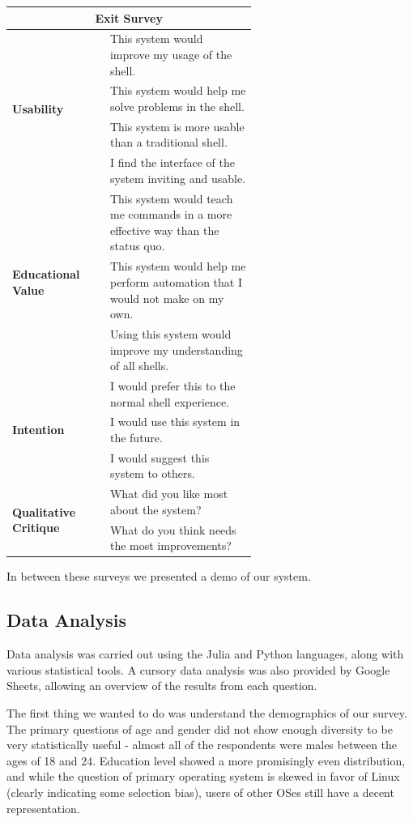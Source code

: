 \begin{center}
  \begin{tabular}{|l|p{0.6\linewidth}|}
    \hline \multicolumn{2}{|c|}{\textbf{\Large Exit Survey}} \\ \hline
    \multirow{4}{*}{\textbf{Usability}}
    & This system would improve my usage of the shell. \\ \cline{2-2}
    & This system would help me solve problems in the shell. \\ \cline{2-2}
    & This system is more usable than a traditional shell. \\ \cline{2-2}
    & I find the interface of the system inviting and usable. \\
    \hline
    \multirow{3}{*}{\textbf{Educational Value}}
    & This system would teach me commands in a more effective way than the
      status quo. \\ \cline{2-2}
    & This system would help me perform automation that I would not make on my
      own.\\ \cline{2-2}
    & Using this system would improve my understanding of all shells.\\
    \hline
    \multirow{3}{*}{\textbf{Intention}}
    & I would prefer this to the normal shell experience. \\ \cline{2-2}
    & I would use this system in the future. \\ \cline{2-2}
    & I would suggest this system to others. \\
    \hline
    \multirow{2}{*}{\textbf{Qualitative Critique}}
    & What did you like most about the system?  \\ \cline{2-2}
    & What do you think needs the most improvements? \\
    \hline
  \end{tabular}
\end{center}
In between these surveys we presented a demo of our system.

\subsection{Data Analysis}

Data analysis was carried out using the Julia and Python languages, along with
various statistical tools. A cursory data analysis was also provided by Google
Sheets, allowing an overview of the results from each question.

The first thing we wanted to do was understand the demographics of our survey.
The primary questions of age and gender did not show enough diversity to be very
statistically useful \-- almost all of the respondents were males between the
ages of 18 and 24. Education level showed a more promisingly even distribution,
and while the question of primary operating system is skewed in favor of Linux
(clearly indicating some selection bias), users of other OSes still have a
decent representation.


